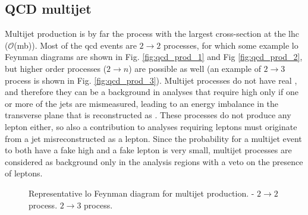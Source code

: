 \subsection{QCD multijet}

Multijet production is by far the process with the largest cross-section at the \gls{lhc} ($\mathcal{O}$(mb)). 
Most of the \gls{qcd} events are $2 \to 2$ processes, for which some example \gls{lo} Feynman diagrams are shown in Fig. \ref{fig:qcd_prod_1} and Fig \ref{fig:qcd_prod_2}, but higher order processes ($2 \to n$) are possible as well (an example of $2 \to 3$ process is shown in Fig. \ref{fig:qcd_prod_3}). 
Multijet processes do not have real \met, and therefore they can be a background in analyses that require high \met only if one or more of the jets are mismeasured, leading to an energy imbalance in the transverse plane that is reconstructed as \met. 
These processes do not produce any lepton either, so also a contribution to analyses requiring leptons must originate from a jet misreconstructed as a lepton. 
Since the probability for a multijet event to both have a fake high \met and a fake lepton is very small, multijet processes are considered as background only in the analysis regions with a veto on the presence of leptons. 


\begin{figure}[h!]
\centering 
{}
\caption{Representative \gls{lo} Feynman diagram for multijet production. - $2 \to 2$ process. 
 $2 \to 3$ process.}\label{fig:qcd_prod}
\end{figure}

